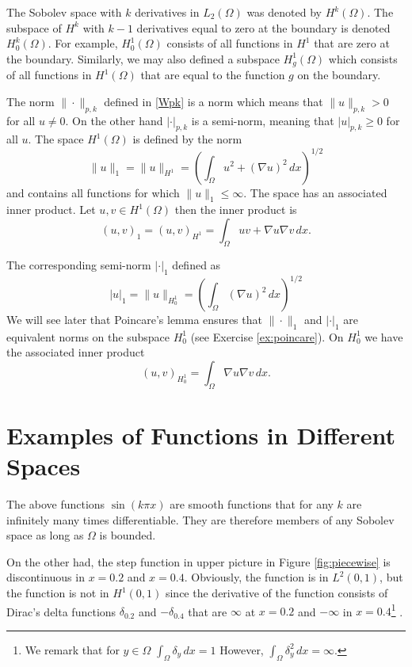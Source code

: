 The Sobolev space with $k$ derivatives in $L_2(\Omega)$ was denoted by $H^k(\Omega)$. The subspace
of $H^k$ with $k-1$ derivatives equal to zero at the boundary is denoted 
$H^k_0(\Omega)$. For example, $H^1_0(\Omega)$ consists of all functions in $H^1$ that are zero 
at the boundary. Similarly, we may also defined a subspace  
$H^1_g(\Omega)$ which consists of all functions in $H^1(\Omega)$ that are equal to the function $g$ 
on the boundary. 

The norm $\|\cdot\|_{p,k}$ defined in \eqref{Wpk} is a norm
which means that $\|u\|_{p,k} > 0$ for all $u\not=0$.    
On the other hand  $|\cdot|_{p,k}$ is a semi-norm, meaning 
that $|u|_{p,k} \ge  0$ for all $u$.   
The space $H^1(\Omega)$ is defined by the norm 
\[
\|u\|_1 = \|u\|_{H^1}  = (\int_\Omega u^2 + (\nabla u)^2 \, dx)^{1/2}  
\]
and contains all functions for which $\|u\|_1 \le \infty$. 
The space has an associated inner product. Let $u, v \in H^1(\Omega)$ then the inner product is 
\[
(u, v)_1 = (u, v)_{H^1}  = \int_\Omega u v  + \nabla u \nabla v  \, dx  .  
\]
 
The corresponding semi-norm $|\cdot|_1$ defined as 
\[
|u|_1 = \|u\|_{H_0^1} =   (\int_\Omega  (\nabla u)^2 \, dx)^{1/2}  
\]
We will see later that Poincare's lemma
ensures that $\|\cdot\|_1$ and  $|\cdot|_1$ are equivalent norms on  the subspace $H^1_0$ (see Exercise \ref{ex:poincare}).  
On $H^1_0$ we have the associated inner product  
\[
(u,v)_{H^1_0 } = \int_\Omega \nabla u \nabla v  \, dx  .  
\]




\section{Examples of Functions in Different Spaces}

The above functions $\sin(k \pi x)$ are smooth functions
that for any $k$ are infinitely many times differentiable. 
They are therefore members of any Sobolev space as long as $\Omega$ is bounded.  

On the other had, the step function in upper picture in Figure \ref{fig:piecewise} is 
discontinuous in $x=0.2$ and $x=0.4$. Obviously, the function is in $L^2(0,1)$, but 
the function is not in $H^1(0,1)$ since the derivative of the function  consists of Dirac's 
delta functions $\delta_{0.2}$  and $-\delta_{0.4}$ 
that are $\infty$ at $x=0.2$ and $-\infty$ in $x=0.4$\footnote{We remark that 
for $y \in \Omega$ 
$\int_\Omega \delta_y \, dx = 1 $ However, $\int_\Omega \delta^2_y \, dx = \infty $.  
}
. 

